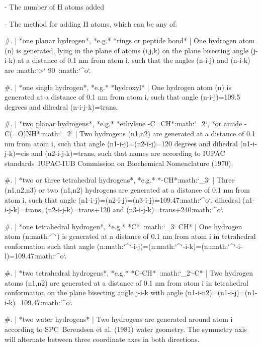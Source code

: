 -  The number of H atoms added

-  The method for adding H atoms, which can be any of:

   #. | *one planar hydrogen*, *e.g.* *rings or peptide bond*
      | One hydrogen atom (n) is generated, lying in the plane of atoms
        (i,j,k) on the plane bisecting angle (j-i-k) at a distance of
        0.1 nm from atom i, such that the angles (n-i-j) and (n-i-k) are
        :math:`>` 90\ :math:`^{\rm o}`.

   #. | *one single hydrogen*, *e.g.* *hydroxyl*
      | One hydrogen atom (n) is generated at a distance of 0.1 nm from
        atom i, such that angle (n-i-j)=109.5 degrees and dihedral
        (n-i-j-k)=trans.

   #. | *two planar hydrogens*, *e.g.* *ethylene -C=CH*:math:`_2`, *or amide
        -C(=O)NH*:math:`_2`
      | Two hydrogens (n1,n2) are generated at a distance of 0.1 nm from
        atom i, such that angle (n1-i-j)=(n2-i-j)=120 degrees and
        dihedral (n1-i-j-k)=cis and (n2-i-j-k)=trans, such that names
        are according to IUPAC standards IUPAC-IUB Commission on
        Biochemical Nomenclature (1970).

   #. | *two or three tetrahedral hydrogens*, *e.g.* *-CH*:math:`_3`
      | Three (n1,n2,n3) or two (n1,n2) hydrogens are generated at a
        distance of 0.1 nm from atom i, such that angle
        (n1-i-j)=(n2-i-j)=(n3-i-j)=109.47:math:`^{\rm o}`, dihedral
        (n1-i-j-k)=trans, (n2-i-j-k)=trans+120 and
        (n3-i-j-k)=trans+240:math:`^{\rm o}`.

   #. | *one tetrahedral hydrogen*, *e.g.* *C*\ :math:`_3`\* CH*
      | One hydrogen atom (n:math:`^\prime`) is generated at a distance
        of 0.1 nm from atom i in tetrahedral conformation such that
        angle
        (n:math:`^\prime`-i-j)=(n:math:`^\prime`-i-k)=(n:math:`^\prime`-i-l)=109.47:math:`^{\rm o}`.

   #. | *two tetrahedral hydrogens*, *e.g.* *C-CH*\ :math:`_2`\*-C*
      | Two hydrogen atoms (n1,n2) are generated at a distance of 0.1 nm
        from atom i in tetrahedral conformation on the plane bisecting
        angle j-i-k with angle
        (n1-i-n2)=(n1-i-j)=(n1-i-k)=109.47:math:`^{\rm o}`.

   #. | *two water hydrogens*
      | Two hydrogens are generated around atom i according to
        SPC Berendsen et al. (1981) water geometry. The symmetry axis
        will alternate between three coordinate axes in both directions.

